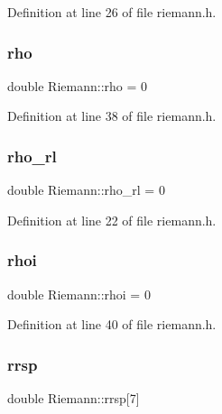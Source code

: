 Definition at line 26 of file riemann.\+h.

\mbox{\label{classRiemann_a780005bbc3c529834bd7a1bc436528a2}} 
\subsubsection{\texorpdfstring{rho}{rho}}
{\footnotesize\ttfamily double Riemann\+::rho = 0\hspace{0.3cm}{\ttfamily [private]}}



Definition at line 38 of file riemann.\+h.

\mbox{\label{classRiemann_a16fcc1621ba3949c6541fc7c42d3af7f}} 
\subsubsection{\texorpdfstring{rho\+\_\+rl}{rho\_rl}}
{\footnotesize\ttfamily double Riemann\+::rho\+\_\+rl = 0\hspace{0.3cm}{\ttfamily [private]}}



Definition at line 22 of file riemann.\+h.

\mbox{\label{classRiemann_a61a0bda4853dafde0aeb9501760e160e}} 
\subsubsection{\texorpdfstring{rhoi}{rhoi}}
{\footnotesize\ttfamily double Riemann\+::rhoi = 0\hspace{0.3cm}{\ttfamily [private]}}



Definition at line 40 of file riemann.\+h.

\mbox{\label{classRiemann_adaf0219875f862407cddf578d361967c}} 
\subsubsection{\texorpdfstring{rrsp}{rrsp}}
{\footnotesize\ttfamily double Riemann\+::rrsp\mbox{[}7\mbox{]}\hspace{0.3cm}{\ttfamily [private]}}



